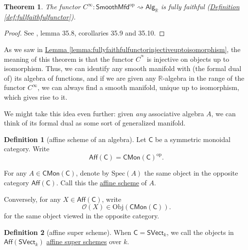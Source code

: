 \documentclass[a4paper]{report}
\newcommand{\R}{\mathbb{R}}
\newcommand{\defn}[1]{\ul{#1}}
\newcommand{\Obj}{\mathrm{Obj}}
\newcommand{\Spec}{\mathrm{Spec}}
\theoremstyle{definition}
\newtheorem{definition}{Definition}[section]
\theoremstyle{plain}
\newtheorem{theorem}{Theorem}[section]
\theoremstyle{remark}
\begin{document}
\begin{theorem}
  The functor $C^{\infty}\colon \mathsf{SmoothMfd}^{\mathrm{op}} \rightsquigarrow \mathsf{Alg}_{\R}$ is fully faithful (\hyperref[def:fullfaithfulfunctor]{Definition \ref*{def:fullfaithfulfunctor}}).
\end{theorem}
\begin{proof}
  See \cite{KMS-natural-operations-differential-geometry}, lemma 35.8, corollaries 35.9 and 35.10.
\end{proof}

As we saw in \hyperref[lemma:fullyfaithfulfunctorinjectiveuptoisomorphism]{Lemma \ref*{lemma:fullyfaithfulfunctorinjectiveuptoisomorphism}}, the meaning of this theorem is that the functor $C^{^\infty}$ is injective on objects up to isomorphism. Thus, we can identify any smooth manifold with (the formal dual of) its algebra of functions, and if we are given any $\R$-algebra in the range of the functor $C^{\infty}$, we can always find a smooth manifold, unique up to isomorphism, which gives rise to it.

We might take this idea even further: given \emph{any} associative algebra $A$, we can think of its formal dual as some sort of generalized manifold. 

\begin{definition}[affine scheme of an algebra]
  \label{def:affineschemeofanalgebra}
  Let $\mathsf{C}$ be a symmetric monoidal category. Write
  \begin{equation*}
    \mathsf{Aff}(\mathsf{C}) = \mathsf{CMon}(\mathsf{C})^{\text{op}}.
  \end{equation*}

  For any $A \in \mathsf{CMon}(\mathsf{C})$, denote by $\Spec(A)$ the same object in the opposite category $\mathsf{Aff}(\mathsf{C})$. Call this the \defn{affine scheme} of $A$.

  Conversely, for any $X \in \mathsf{Aff}(\mathsf{C})$, write 
  \begin{equation*}
    \mathscr{O}(X) \in \Obj(\mathsf{CMon}(\mathsf{C})).
  \end{equation*}
  for the same object viewed in the opposite category.
\end{definition}

\begin{definition}[affine super scheme]
  \label{def:affinesuperscheme}
  When $\mathsf{C} = \mathsf{SVect}_{k}$, we call the objects in $\mathsf{Aff}(\mathsf{SVect}_{k})$ \defn{affine super schemes} over $k$.
\end{definition}
\end{document}
